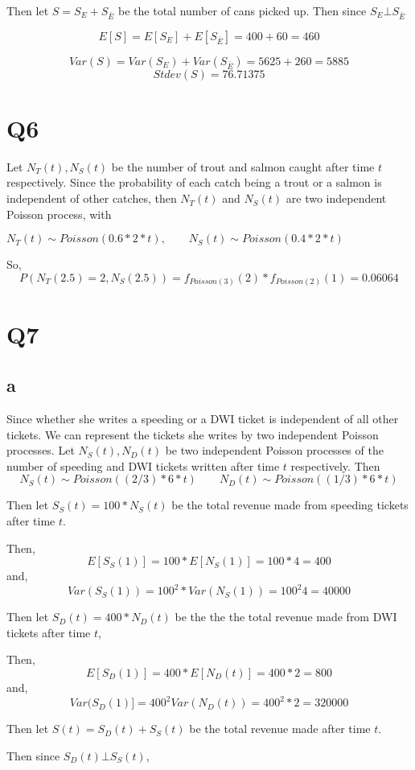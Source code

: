 \documentclass{article}
\begin{document}
Then let $S = S_E + S_{\bar E}$ be the total number of cans picked up.
Then since $S_E \bot S_{\bar E}$

$$
E[S] = E[S_E] + E[S_{\bar E}] = 400 + 60 = 460
$$

$$
Var(S) = Var(S_E) + Var(S_{\bar E}) = 5625 + 260 = 5885
$$
$$
Stdev(S) = 76.71375
$$

\section*{Q6}
Let $N_T(t), N_S(t) $ be the number of trout and salmon caught after time $t$ respectively. Since the probability of each catch being a trout or a salmon is independent of other catches, then $N_T(t)$ and $N_S(t)$ are two independent Poisson process, with 

$N_T(t) \sim Poisson(0.6 * 2 * t), \qquad N_S(t) \sim Poisson(0.4 * 2 * t)$

So, 
$$
P(N_T(2.5) = 2, N_S(2.5)) = f_{Poisson(3)}(2)*f_{Poisson(2)}(1) = 0.06064
$$

\section*{Q7}
\subsection*{a}
Since whether she writes a speeding or a DWI ticket is independent of all other tickets. We can represent the tickets she writes by two independent Poisson processes. 
Let $N_{S}(t), N_{D}(t)$ be two independent Poisson processes of the number of speeding and DWI tickets written after time $t$ respectively. 
Then
$$
N_S(t) \sim Poisson((2/3) * 6 * t) \qquad N_D(t) \sim Poisson((1/3) * 6 * t)
$$  

Then let $S_S(t) = 100 * N_S(t)$ be the total revenue made from speeding tickets after time $t$. 

Then, 
$$E[S_S(1)] = 100 * E[N_S(1)] = 100 * 4 = 400$$
and,
$$Var(S_S(1)) = 100^2 * Var(N_S(1)) = 100^2 4 = 40000
$$

Then let $S_D(t) = 400 * N_D(t)$ be the the the total revenue made from DWI tickets after time $t$,

Then,
$$
E[S_D(1)] = 400 * E[N_D(t)] = 400 *2 = 800
$$
and,
$$
Var(S_D(1)] = 400^2 Var(N_D(t)) = 400^2 * 2 = 320000
$$

Then let $S(t) = S_D(t) + S_S(t)$ be the total revenue made after time $t$.

Then since $S_D(t) \bot S_S(t)$,
\end{document}
